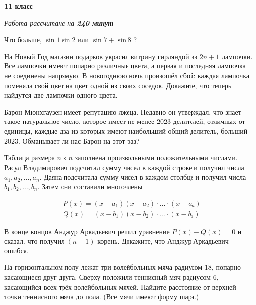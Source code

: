 \centerline{\bf \huge 11 класс}

\centerline{\normalsize{\it Работа рассчитана на \bf{240} минут}}

Что больше, $\sin 1 \sin 2$ или $\sin 7+\sin 8$ ?


На Новый Год магазин подарков украсил витрину гирляндой из $2 n+1$ лампочки. Все лампочки имеют попарно различные цвета, а первая и последняя лампочка не соединены напрямую. В новогоднюю ночь произошёл сбой: каждая лампочка поменяла свой цвет на цвет одной из своих соседок. Докажите, что теперь найдутся две лампочки одного цвета.


Барон Мюнхгаузен имеет репутацию лжеца. Недавно он утверждал, что знает такое натуральное число, которое имеет не менее 2023 делителей, отличных от единицы, каждые два из которых имеют наибольший общий делитель, больший 2023. Обманывает ли нас Барон на этот раз?


Таблица размера $n \times n$ заполнена произвольными положительными числами. Расул Владимирович подсчитал сумму чисел в каждой строке и получил числа $a_1, a_2, \ldots, a_n$. Даяна подсчитала сумму чисел в каждом столбце и получил числа $b_1, b_2, \ldots, b_n$. Затем они составили многочлены

$$
\begin{aligned}
& P(x)=\left(x-a_1\right)\left(x-a_2\right) \cdot \ldots \cdot\left(x-a_n\right) \\
& Q(x)=\left(x-b_1\right)\left(x-b_2\right) \cdot \ldots \cdot\left(x-b_n\right)
\end{aligned}
$$


В конце концов Анджур Аркадьевич решил уравнение $P(x)-Q(x)=0$ и сказал, что получил $(n-1)$ корень. Докажите, что Анджур Аркадьевич ошибся.


На горизонтальном полу лежат три волейбольных мяча радиусом 18, попарно касающиеся друг друга. Сверху положили теннисный мяч радиусом 6, касающийся всех трёх волейбольных мячей. Найдите расстояние от верхней точки теннисного мяча до пола. (Все мячи имеют форму шара.)

